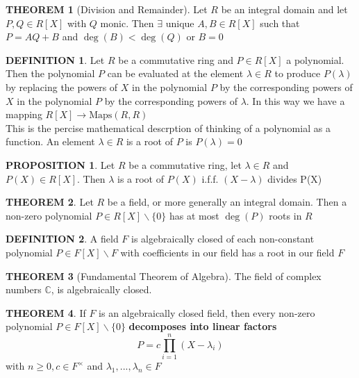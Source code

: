 \documentclass[12pt]{article}
\theoremstyle{definition}
\newtheorem{definition}{DEFINITION}[subsection]
\newtheorem{theorem}{THEOREM}[subsection]
\newcommand{\Maps}{\text{Maps}}
\newtheorem{prop}{PROPOSITION}[subsection]
\begin{document}
\begin{theorem}[Division and Remainder]
    Let $R$ be an integral domain and let $P,Q\in R[X]$ with $Q$ monic. Then $\exists$ unique $A,B\in R[X]$ such that $P = AQ + B$ and $\deg(B) < \deg(Q)$ or $B = 0$
\end{theorem}

\begin{definition}
    Let $R$ be a commutative ring and $P\in R[X]$ a polynomial. Then the polynomial $P$ can be evaluated at the element $\lambda \in R$ to produce $P(\lambda)$ by replacing the powers of $X$ in the polynomial $P$ by the corresponding powers of $X$ in the polynomial $P$ by the corresponding powers of $\lambda$. In this way we have a mapping $R[X]\rightarrow\Maps(R,R)$\\This is the percise mathematical descrption of thinking of a polynomial as a function. An element $\lambda \in R$ is a root of $P$ is $P(\lambda) = 0$
\end{definition}

\begin{prop}
    Let $R$ be a commutative ring, let $\lambda \in R$ and $P(X) \in R[X]$. Then $\lambda$ is a root of $P(X)$ i.f.f. $(X - \lambda)$ divides P(X) 
\end{prop}

\begin{theorem}
    Let $R$ be a field, or more generally an integral domain. Then a non-zero polynomial $P \in R[X]\backslash\{0\}$ has at most $\deg(P)$ roots in $R$
\end{theorem}

\begin{definition}
    A field $F$ is algebraically closed of each non-constant polynomial $P \in F[X]\backslash F$ with coefficients in our field has a root in our field $F$
\end{definition}

\begin{theorem}[Fundamental Theorem of Algebra]
    The field of complex numbers $\mathbb{C}$, is algebraically closed.
\end{theorem}

\begin{theorem}
    If $F$ is an algebraically closed field, then every non-zero polynomial $P\in F[X]\backslash\{0\}$ \textbf{decomposes into linear factors}
    $$P = c\prod_{i=1}^n{(X-\lambda_i)}$$
    with $n \geq 0, c\in F^\times$ and $\lambda_1,...,\lambda_n\in F$
\end{theorem}
\end{document}
